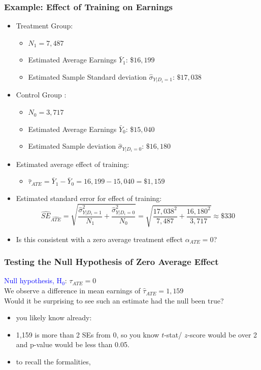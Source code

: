 \documentclass[xcolor=dvipsnames]{beamer}
\begin{document}
\begin{frame}
  \frametitle{Example: Effect of Training on Earnings}
\small
\begin{itemize}
  \item Treatment Group:
  \begin{itemize}
  \item $N_1=7,487$
    \item Estimated Average Earnings $\bar{Y}_1$: \$$16,199$
    \item Estimated Sample Standard deviation $\widehat{\sigma}_{Y|D_i=1}$: $\$17,038$
  \end{itemize}\smallskip

  \item Control Group :
  \begin{itemize}
  \item $N_0=3,717$
    \item Estimated Average Earnings $\bar{Y}_0$: \$$15,040$
    \item Estimated Sample  deviation $\widehat{\sigma}_{Y|D_i=0}$: $\$16,180$
  \end{itemize}\smallskip
  \item Estimated average effect of training: \pause
  \begin{itemize}
    \item $\widehat{\tau}_{ATE} = \bar{Y}_1 - \bar{Y}_0 = 16,199 - 15,040 = \$1,159$
  \end{itemize}\smallskip
  \item Estimated standard error for effect of training: \pause
\scriptsize
$$\widehat{ SE}_{\widehat{ATE}} = \sqrt{ \frac{ \widehat{\sigma}^2_{Y|D_i=1}  }{N_1}+ \frac{ \widehat{\sigma}^2_{Y|D_i=0} }{N_0}} = \sqrt{\frac{17,038^2}{7,487}+ \frac{16,180^2}{3,717} }\approx\$330$$
\small
  \item Is this consistent with a zero average treatment effect $\alpha_{ATE}=0$?
\end{itemize}

\end{frame}


\begin{frame}
  \frametitle{Testing the Null Hypothesis of Zero Average Effect}
\small
{} \textcolor{Blue}{Null hypothesis, H$_0$}: $\tau_{ATE}=0$\\
\bigskip
{} We observe a difference in mean earnings of $\hat{\tau}_{ATE}=1,159$ \\
\bigskip
{} Would it be surprising to see such an estimate had the null been true? \\
\footnotesize
\begin{itemize}
\item<4-> you likely know already:
\item<5-> 1,159 is more than 2 SEs from 0, so you know $t$-stat/ $z$-score would be over 2 and p-value would be less than 0.05.
\smallskip
\item<6-> to recall the formalities,
\end{itemize}
\end{frame}
\end{document}

